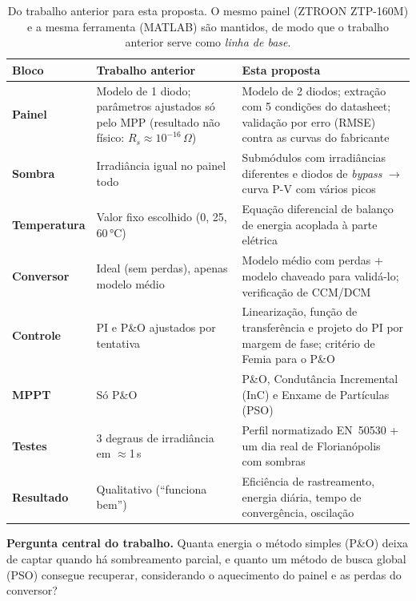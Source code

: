 \documentclass[11pt,a4paper]{article}
\begin{document}
\begin{table}[h]
\centering\small
\renewcommand{\arraystretch}{1.25}
\begin{tabularx}{\linewidth}{>{\bfseries}l X X}
\toprule
Bloco & Trabalho anterior & Esta proposta \\
\midrule
Painel & Modelo de 1 diodo; parâmetros ajustados só pelo MPP (resultado não físico:
$R_s\approx10^{-16}\,\Omega$) & Modelo de 2 diodos; extração com 5 condições do datasheet;
validação por erro (RMSE) contra as curvas do fabricante \\
Sombra & Irradiância igual no painel todo & Submódulos com irradiâncias diferentes e diodos
de \emph{bypass} $\to$ curva P-V com vários picos \\
Temperatura & Valor fixo escolhido (0, 25, 60\,°C) & Equação diferencial de balanço de
energia acoplada à parte elétrica \\
Conversor & Ideal (sem perdas), apenas modelo médio & Modelo médio com perdas + modelo
chaveado para validá-lo; verificação de CCM/DCM \\
Controle & PI e P\&O ajustados por tentativa & Linearização, função de transferência e
projeto do PI por margem de fase; critério de Femia para o P\&O \\
MPPT & Só P\&O & P\&O, Condutância Incremental (InC) e Enxame de Partículas (PSO) \\
Testes & 3 degraus de irradiância em $\approx$1\,s & Perfil normatizado EN~50530 + um dia
real de Florianópolis com sombras \\
Resultado & Qualitativo (``funciona bem'') & Eficiência de rastreamento, energia diária,
tempo de convergência, oscilação \\
\bottomrule
\end{tabularx}
\caption{Do trabalho anterior para esta proposta. O mesmo painel (ZTROON ZTP-160M) e a mesma
ferramenta (MATLAB) são mantidos, de modo que o trabalho anterior serve como \emph{linha de base}.}
\label{tab:comparacao}
\end{table}

\begin{pergunta}
\textbf{Pergunta central do trabalho.} Quanta energia o método simples (P\&O) deixa de
captar quando há sombreamento parcial, e quanto um método de busca global (PSO) consegue
recuperar, considerando o aquecimento do painel e as perdas do conversor?
\end{pergunta}

\end{document}
